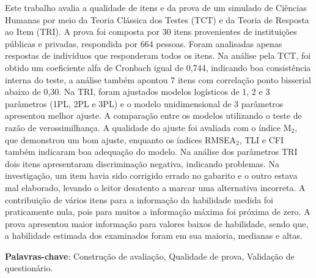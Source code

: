 \begin{resumo}
	
Este trabalho avalia a qualidade de itens e da prova de um simulado de Ciências Humanas por meio da Teoria Clássica dos Testes (TCT) e da Teoria de Resposta ao Item (TRI). A prova foi composta por 30 itens provenientes de instituições públicas e privadas, respondida por 664 pessoas. Foram analisadas apenas respostas de indivíduos que responderam todos os itens. Na análise pela TCT, foi obtido um coeficiente alfa de Cronbach igual de 0,744, indicando boa consistência interna do teste, a análise também apontou 7 itens com correlação ponto bisserial abaixo de 0,30.  Na TRI, foram ajustados modelos logísticos de 1, 2 e 3 parâmetros (1PL, 2PL e 3PL) e o modelo unidimensional de 3 parâmetros apresentou melhor ajuste. A comparação entre os modelos utilizando o teste de razão de verossimilhança. A qualidade do ajuste foi avaliada com o índice M$_2$, que demonstrou um bom ajuste,  enquanto os índices RMSEA$_2$, TLI e CFI também indicaram boa adequação do modelo. Na análise dos parâmetros TRI dois itens apresentaram discriminação negativa, indicando problemas. Na investigação, um item havia sido corrigido errado no gabarito e o outro estava mal elaborado, levando o leitor desatento a marcar uma alternativa incorreta. A contribuição de vários itens para a informação da habilidade medida foi praticamente nula, pois para muitos a informação máxima foi próxima de zero. A prova apresentou maior informação para valores baixos de habilidade, sendo que, a habilidade estimada dos examinados foram em sua maioria, medianas e altas.

\textbf{Palavras-chave}: Construção de avaliação, Qualidade de prova, Validação de questionário.
\end{resumo}

